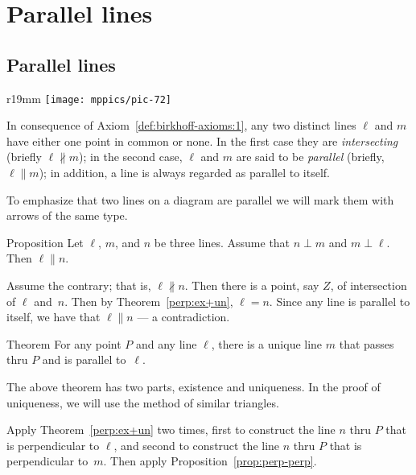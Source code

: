 \chapter{Parallel lines}\label{chap:angle-sum}

\section{Parallel lines}

{

\begin{wrapfigure}{r}{19mm}
\vskip-4mm
\centering
\texttt{[image: mppics/pic-72]}
\end{wrapfigure}

In consequence of Axiom~\ref{def:birkhoff-axioms:1}, 
any two distinct lines $\ell$ and $m$ have either one point
in common or none. 
In the first case they are \emph{intersecting} (briefly $\ell\nparallel m$); 
in the second case, $\ell$ and $m$ are said to be \emph{parallel} (briefly, $\ell\parallel m$);
in addition, a line is always regarded as parallel to itself.

}

To emphasize that two lines on a diagram are parallel we will mark them with arrows of the same type.



\begin{thm}[\abs]{Proposition}\label{prop:perp-perp} Let $\ell$, $m$, and $n$ be three lines.
Assume that $n\perp m$ and $m\perp \ell$.
Then $\ell\parallel n$. 
\end{thm}

Assume the contrary; 
that is, $\ell\nparallel n$.
Then there is a point, say $Z$, of intersection of $\ell$ and~$n$.
Then by Theorem~\ref{perp:ex+un},
$\ell=n$.
Since any line is parallel to itself, we have that $\ell\parallel n$ --- a contradiction.
\qeds

\begin{thm}{Theorem}\label{thm:parallel}
For any point $P$ and any line $\ell$,
there is a unique line $m$
that passes thru $P$ and is parallel to~$\ell$.
\end{thm}

The above theorem has two parts, existence and uniqueness.
In the proof of uniqueness, we will use the method of similar triangles.

Apply Theorem~\ref{perp:ex+un} two times,
first to construct the line $n$ thru $P$ that is perpendicular to $\ell$,
and second to construct the line $n$ thru $P$ that is perpendicular to~$m$.
Then apply Proposition~\ref{prop:perp-perp}.

